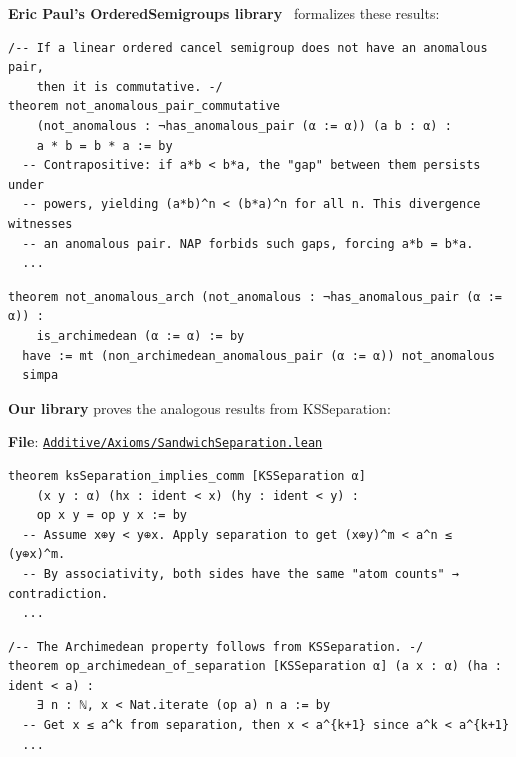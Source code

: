 \documentclass[11pt]{article}
\theoremstyle{definition}
\theoremstyle{remark}
\begin{document}
\textbf{Eric Paul's OrderedSemigroups library}~\cite{Paul2024} formalizes these results:

\begin{lstlisting}[caption={NAP $\Rightarrow$ Commutativity (Paul, \href{https://github.com/ericluap/OrderedSemigroups/blob/main/OrderedSemigroups/Archimedean.lean\#L357-L395}{Archimedean.lean:357--395})},numbers=none]
/-- If a linear ordered cancel semigroup does not have an anomalous pair,
    then it is commutative. -/
theorem not_anomalous_pair_commutative
    (not_anomalous : ¬has_anomalous_pair (α := α)) (a b : α) :
    a * b = b * a := by
  -- Contrapositive: if a*b < b*a, the "gap" between them persists under
  -- powers, yielding (a*b)^n < (b*a)^n for all n. This divergence witnesses
  -- an anomalous pair. NAP forbids such gaps, forcing a*b = b*a.
  ...
\end{lstlisting}

\begin{lstlisting}[caption={NAP $\Rightarrow$ Archimedean (Paul, \href{https://github.com/ericluap/OrderedSemigroups/blob/main/OrderedSemigroups/Archimedean.lean\#L397-L400}{Archimedean.lean:397--400})},numbers=none]
theorem not_anomalous_arch (not_anomalous : ¬has_anomalous_pair (α := α)) :
    is_archimedean (α := α) := by
  have := mt (non_archimedean_anomalous_pair (α := α)) not_anomalous
  simpa
\end{lstlisting}

\textbf{Our library} proves the analogous results from KSSeparation:

\textbf{File}: \href{https://github.com/zariuq/ks-foundations-of-inference/blob/main/KnuthSkilling/Additive/Axioms/SandwichSeparation.lean}{\texttt{Additive/Axioms/SandwichSeparation.lean}}

\begin{lstlisting}[caption={Separation $\Rightarrow$ Commutativity (\href{https://github.com/zariuq/ks-foundations-of-inference/blob/main/KnuthSkilling/Additive/Axioms/SandwichSeparation.lean\#L404}{SandwichSeparation.lean:404})},numbers=none]
theorem ksSeparation_implies_comm [KSSeparation α]
    (x y : α) (hx : ident < x) (hy : ident < y) :
    op x y = op y x := by
  -- Assume x⊕y < y⊕x. Apply separation to get (x⊕y)^m < a^n ≤ (y⊕x)^m.
  -- By associativity, both sides have the same "atom counts" → contradiction.
  ...
\end{lstlisting}

\begin{lstlisting}[caption={Separation $\Rightarrow$ Archimedean (\href{https://github.com/zariuq/ks-foundations-of-inference/blob/main/KnuthSkilling/Additive/Axioms/SandwichSeparation.lean\#L132-L144}{SandwichSeparation.lean:132--144})},numbers=none]
/-- The Archimedean property follows from KSSeparation. -/
theorem op_archimedean_of_separation [KSSeparation α] (a x : α) (ha : ident < a) :
    ∃ n : ℕ, x < Nat.iterate (op a) n a := by
  -- Get x ≤ a^k from separation, then x < a^{k+1} since a^k < a^{k+1}
  ...
\end{lstlisting}
\end{document}
